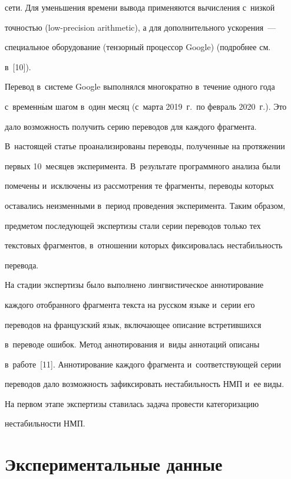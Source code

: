 сети. Для уменьшения времени вывода применяются вычисления с~низкой 


точностью (low-precision arithmetic), а для дополнительного ускорения~--- 


специальное оборудование (тензорный процессор Google) (подробнее см.\ 


в~[10]).


  


  Перевод в~системе Google выполнялся многократно в~течение одного года 


с~временн$\acute{\mbox{ы}}$м шагом в~один месяц (с~марта 2019~г.\ по февраль 2020~г.). Это 


дало возможность получить серию переводов для каждого фрагмента. 


В~настоящей статье проанализированы переводы, полученные на протяжении 


первых 10~месяцев эксперимента. В~результате программного анализа были 


помечены и~исключены из рассмотрения те фрагменты, переводы которых 


оставались неизменными в~период проведения эксперимента. Таким образом, 


предметом последующей экспертизы стали серии переводов только тех 


текстовых фрагментов, в~отношении которых фиксировалась нестабильность 


перевода.


  


  На стадии экспертизы было выполнено лингвистическое аннотирование 


каж\-до\-го отобранного фрагмента текста на русском языке и~серии его 


переводов на французский язык, включающее описание встретившихся 


в~переводе ошибок. Метод аннотирования и~виды аннотаций описаны 


в~работе~[11]. Аннотирование каждого фрагмента и~соответствующей серии 


переводов дало возможность зафиксировать нестабильность НМП и~ее виды. 


На первом этапе экспертизы ставилась задача провести категоризацию 


нестабильности НМП.





\section{Экспериментальные данные}





